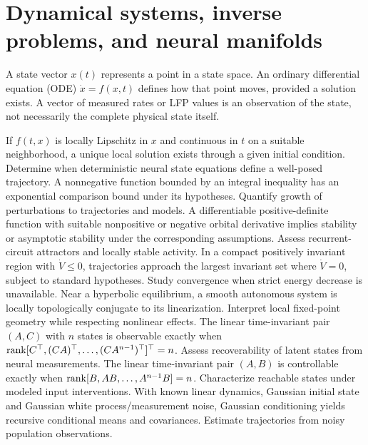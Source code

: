\chapter[Dynamics and neural manifolds]{Dynamical systems, inverse problems, and neural manifolds}
A state vector $x(t)$ represents a point in a state space.
An ordinary differential equation (ODE) $\dot x=f(x,t)$ defines
how that point moves, provided a solution exists. A vector of
measured rates or LFP values is an observation of the state,
not necessarily the complete physical state itself.

{If $f(t,x)$ is locally Lipschitz in $x$ and continuous in $t$
on a suitable neighborhood, a unique local solution exists
through a given initial condition.}
{Determine when deterministic neural state equations define a
well-posed trajectory.}
{A nonnegative function bounded by an integral inequality
has an exponential comparison bound under its hypotheses.}
{Quantify growth of perturbations to trajectories and models.}
{A differentiable positive-definite function with suitable
nonpositive or negative orbital derivative implies stability
or asymptotic stability under the corresponding assumptions.}
{Assess recurrent-circuit attractors and locally stable activity.}
{In a compact positively invariant region with $\dot V\leq0$,
trajectories approach the largest invariant set where
$\dot V=0$, subject to standard hypotheses.}
{Study convergence when strict energy decrease is unavailable.}
{Near a hyperbolic equilibrium, a smooth autonomous system
is locally topologically conjugate to its linearization.}
{Interpret local fixed-point geometry while respecting nonlinear effects.}
{The linear time-invariant pair $(A,C)$ with $n$ states
is observable exactly when
$\operatorname{rank}[C^\top,(CA)^\top,\ldots,(CA^{n-1})^\top]^\top=n$.}
{Assess recoverability of latent states from neural measurements.}
{The linear time-invariant pair $(A,B)$ is controllable
exactly when
$\operatorname{rank}[B,AB,\ldots,A^{n-1}B]=n$.}
{Characterize reachable states under modeled input interventions.}
{With known linear dynamics, Gaussian initial state and
Gaussian white process/measurement noise, Gaussian conditioning
yields recursive conditional means and covariances.}
{Estimate trajectories from noisy population observations.}
